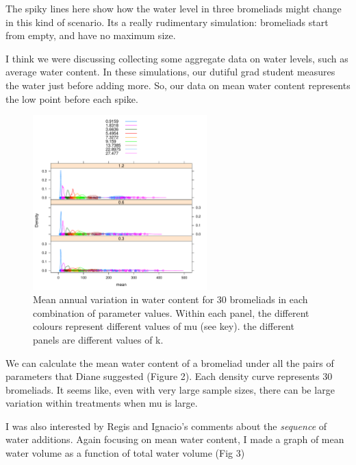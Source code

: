 \documentclass[10pt]{article}
\begin{document}
\begin{spacing}{1.5}
The spiky lines here show how the water level in three bromeliads
might change in this kind of scenario. Its a really rudimentary
simulation: bromeliads start from empty, and have no maximum size.

I think we were discussing collecting some aggregate data on water
levels, such as average water content.  In these simulations, our
dutiful grad student measures the water just before adding more.
So, our data on mean water content represents the low point before
each spike.  


\begin{figure}
  \centering
  \includegraphics[width=0.6\textwidth]{meanannual.pdf}
  \caption{Mean annual variation in water content for 30 bromeliads in
    each combination of parameter values.  Within each panel, the
    different colours represent different values of mu (see key).  the
    different panels are different values of k.}
\end{figure}


We can calculate the mean water content of a bromeliad under all the
pairs of parameters that Diane suggested (Figure 2).  Each density
curve represents 30 bromeliads.  It seems like, even with very large
sample sizes, there can be large variation within treatments when mu is
large.

I was also interested by Regis and Ignacio's comments about the
\emph{sequence} of water additions.  Again focusing on mean water
content, I made a graph of mean water volume as a function of total
water volume (Fig 3)


\end{spacing}
\end{document}
